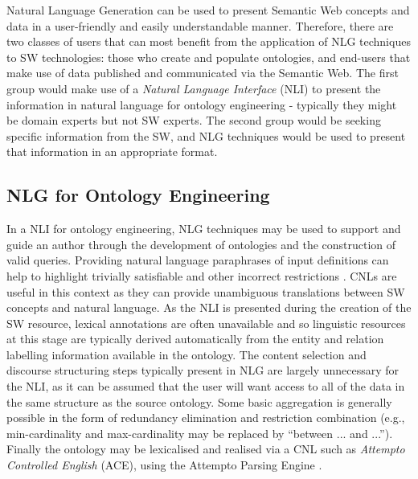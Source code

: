 \documentclass{acm_proc_article-sp}
\begin{document}
Natural Language Generation can be used to present Semantic Web concepts and data in a user-friendly and easily understandable manner. Therefore, there are two classes of users that can most benefit from the application of NLG techniques to SW technologies: those who create and populate ontologies, and end-users that make use of data published and communicated via the Semantic Web. The first group would make use of a \textit{Natural Language Interface} (NLI) to present the information in natural language for ontology engineering \cite{112} - typically they might be domain experts but not SW experts. The second group would be seeking specific information from the SW, and NLG techniques would be used to present that information in an appropriate format.

\subsection{NLG for Ontology Engineering}
In a NLI for ontology engineering, NLG techniques may be used to support and guide an author through the development of ontologies and the construction of valid queries. Providing natural language paraphrases of input definitions can help to highlight trivially satisfiable and other incorrect restrictions \cite{pizzas}. CNLs are useful in this context as they can provide unambiguous translations between SW concepts and natural language. As the NLI is presented during the creation of the SW resource, lexical annotations are often unavailable and so linguistic resources at this stage are typically derived automatically from the entity and relation labelling information available in the ontology.
The content selection and discourse structuring steps typically present in NLG are largely unnecessary for the NLI, as it can be assumed that the user will want access to all of the data in the same structure as the source ontology. Some basic aggregation is generally possible in the form of redundancy elimination and restriction combination (e.g., min-cardinality and max-cardinality may be replaced by ``between ... and ...''). Finally the ontology may be lexicalised and realised via a CNL such as \textit{Attempto Controlled English} (ACE), using the Attempto Parsing Engine \cite{43}. 
\end{document}
